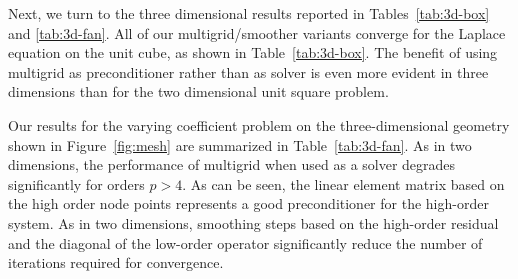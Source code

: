 \documentclass[smallcondensed,final]{svjour3}     %
\begin{document}
Next, we turn to the three dimensional results reported in
Tables~\ref{tab:3d-box} and \ref{tab:3d-fan}. All of our
multigrid/smoother variants converge for the Laplace equation on the
unit cube, as shown in Table~\ref{tab:3d-box}. The benefit of using
multigrid as preconditioner rather than as solver is even more evident
in three dimensions than for the two dimensional unit square
problem.

Our results for the varying coefficient problem on the
three-dimensional geometry shown in Figure~\ref{fig:mesh} are
summarized in Table~\ref{tab:3d-fan}. As in two dimensions, the
performance of multigrid when used as a solver degrades significantly
for orders $p>4$. As can be seen, the linear element matrix based on
the high order node points represents a good preconditioner for the
high-order system. As in two dimensions, smoothing steps based on the
high-order residual and the diagonal of the low-order operator
significantly reduce the number of iterations required for
convergence.
\end{document}
